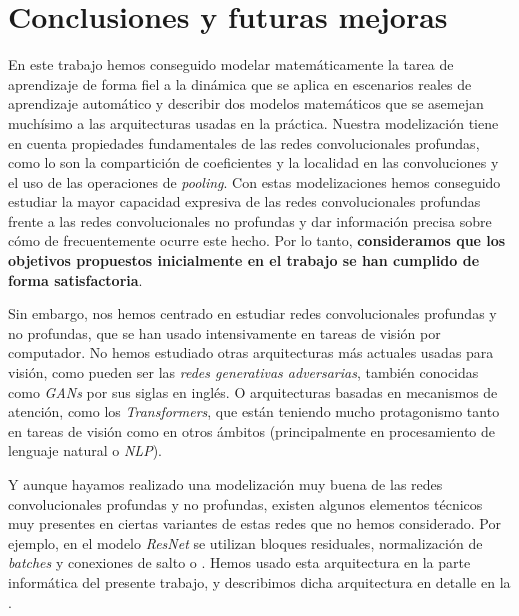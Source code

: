 \chapter{Conclusiones y futuras mejoras} \label{chapter:conclusiones_trabajo_futuro}

En este trabajo hemos conseguido modelar matemáticamente la tarea de aprendizaje de forma fiel a la dinámica que se aplica en escenarios reales de aprendizaje automático y describir dos modelos matemáticos que se asemejan muchísimo a las arquitecturas usadas en la práctica. Nuestra modelización tiene en cuenta propiedades fundamentales de las redes convolucionales profundas, como lo son la compartición de coeficientes y la localidad en las convoluciones y el uso de las operaciones de \textit{pooling}. Con estas modelizaciones hemos conseguido estudiar la mayor capacidad expresiva de las redes convolucionales profundas frente a las redes convolucionales no profundas y dar información precisa sobre cómo de frecuentemente ocurre este hecho. Por lo tanto, \textbf{consideramos que los objetivos propuestos inicialmente en el trabajo se han cumplido de forma satisfactoria}.

Sin embargo, nos hemos centrado en estudiar redes convolucionales profundas y no profundas, que se han usado intensivamente en tareas de visión por computador. No hemos estudiado otras arquitecturas más actuales usadas para visión, como pueden ser las \textit{redes generativas adversarias}, también conocidas como \textit{GANs} por sus siglas en inglés. O arquitecturas basadas en mecanismos de atención, como los \textit{Transformers}, que están teniendo mucho protagonismo tanto en tareas de visión como en otros ámbitos (principalmente en procesamiento de lenguaje natural o \textit{NLP}).

Y aunque hayamos realizado una modelización muy buena de las redes convolucionales profundas y no profundas, existen algunos elementos técnicos muy presentes en ciertas variantes de estas redes que no hemos considerado. Por ejemplo, en el modelo \textit{ResNet} se utilizan bloques residuales, normalización de \textit{batches} y conexiones de salto o . Hemos usado esta arquitectura en la parte informática del presente trabajo, y describimos dicha arquitectura en detalle en la .

